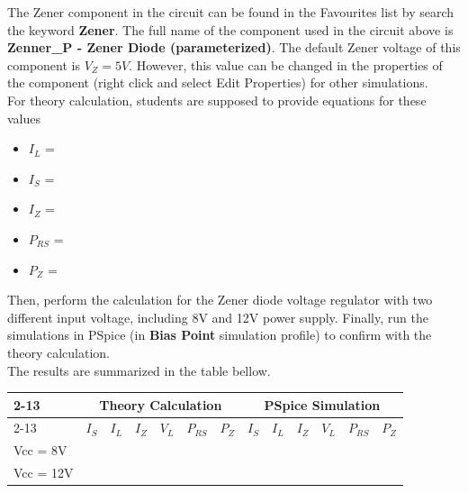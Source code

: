 The Zener component in the circuit can be found in the Favourites list by search the keyword \textbf{Zener}. The full name of the component used in the circuit above is \textbf{Zenner\_P - Zener Diode (parameterized)}. The default Zener voltage of this component is $V_Z = 5V$. However, this value can be changed in the properties of the component (right click and select Edit Properties) for other simulations. \\

For theory calculation, students are supposed to provide equations for these values
\begin{itemize}
    \item $I_{L}$ = \dotfill\\
    \item $I_{S}$ = \dotfill\\
    \item $I_{Z}$ = \dotfill\\
    \item $P_{RS}$ = \dotfill\\
    \item $P_{Z}$ = \dotfill\\
\end{itemize}

Then, perform the calculation for the Zener diode voltage regulator with two different input voltage, including 8V and 12V power supply. Finally, run the simulations in PSpice (in \textbf{Bias Point} simulation profile) to confirm with the theory calculation. \\

The results are summarized in the table bellow.

\begin{center}
 \begin{tabular}{l|l|l|l|l|l|l|l|l|l|l|l|l|}
\cline{2-13}
                              & \multicolumn{6}{c|}{\textbf{Theory Calculation}}                                                                                                          & \multicolumn{6}{c|}{\textbf{PSpice Simulation}}  \\ \cline{2-13} 
                              & \multicolumn{1}{c|}{$I_S$} & \multicolumn{1}{c|}{$I_L$} & \multicolumn{1}{c|}{$I_Z$} & \multicolumn{1}{c|}{$V_L$} & \multicolumn{1}{c|}{$P_{RS}$} & $P_Z$ & $I_S$ & $I_L$ & $I_Z$ & $V_L$ & $P_{RS}$ & $P_Z$ \\ \hline
\multicolumn{1}{|l|}{Vcc = 8V}  &                            &                            &                            &                            &                               &       &       &       &       &       &          &       \\ \hline
\multicolumn{1}{|l|}{Vcc = 12V} &                            &                            &                            &                            &                               &       &       &       &       &       &          &       \\ \hline
\end{tabular}
\end{center}

